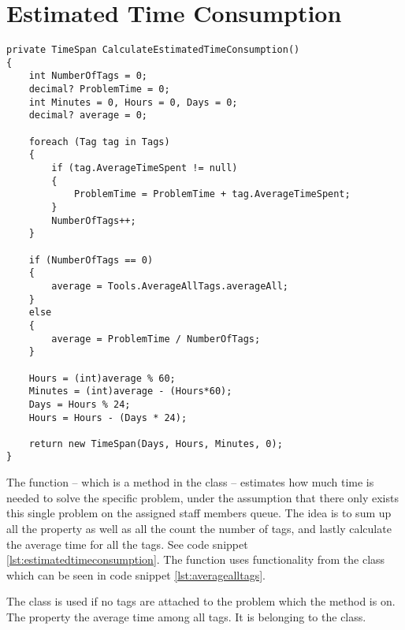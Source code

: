 \section{Estimated Time Consumption}
\label{sec:estimated_time_consumption}



\begin{lstlisting}[style=sourceCode, caption=\myCaption{The ManageTagTimes method. In lines one to seven a property is shown, which wraps the method in lines nine to forty-three.}, label=lst:estimatedtimeconsumption,float=hp]
private TimeSpan CalculateEstimatedTimeConsumption()
{
    int NumberOfTags = 0;
    decimal? ProblemTime = 0;
    int Minutes = 0, Hours = 0, Days = 0;
    decimal? average = 0;
    
    foreach (Tag tag in Tags)
    {
        if (tag.AverageTimeSpent != null)
        {
            ProblemTime = ProblemTime + tag.AverageTimeSpent;
        }
        NumberOfTags++;
    }

    if (NumberOfTags == 0)
    {
        average = Tools.AverageAllTags.averageAll;
    }
    else
    {
        average = ProblemTime / NumberOfTags;
    }

    Hours = (int)average % 60;
    Minutes = (int)average - (Hours*60);
    Days = Hours % 24;
    Hours = Hours - (Days * 24);

    return new TimeSpan(Days, Hours, Minutes, 0);
}
\end{lstlisting}


The  function -- which is a method in the  class -- estimates how much time is needed to solve the specific problem, under the assumption that there only exists this single problem on the assigned staff members queue. The idea is to sum up all the  property as well as all the count the number of tags, and lastly calculate the average time for all the tags. See code snippet \ref{lst:estimatedtimeconsumption}. The  function uses functionality from the  class which can be seen in code snippet \ref{lst:averagealltags}.

The  class is used if no tags are attached to the problem which the  method is on.
The property  the average time among all tags.
It is belonging to the  class.

